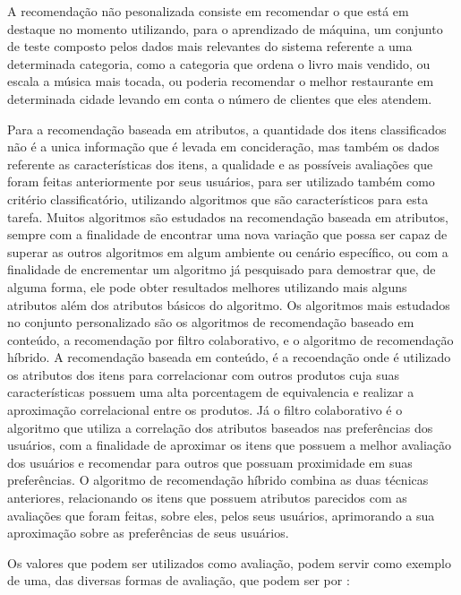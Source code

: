 \documentclass[12pt,
				openright,
				twoside,
				a4paper,
				apter=TITLE,
				section=TITLE,
				subsection=TITLE,
				chapter=TITLE,
				english,
				french,
				spanish,
				brazil]{abntex2}
\begin{document}
A recomendação não pesonalizada consiste em recomendar o que está em destaque no momento utilizando, para o aprendizado de máquina, um conjunto de teste composto pelos dados mais relevantes do sistema referente a uma determinada categoria, como a categoria que ordena o livro mais vendido, ou escala a música mais tocada, ou poderia recomendar o melhor restaurante em determinada cidade levando em conta o número de clientes que eles atendem.

Para a recomendação baseada em atributos, a quantidade dos itens classificados não é a unica informação que é levada em concideração, mas também os dados referente as características dos itens, a qualidade e as possíveis avaliações que foram feitas anteriormente por seus usuários, para ser utilizado também como critério classificatório, utilizando algoritmos que são característicos para esta tarefa. Muitos algoritmos são estudados na recomendação baseada em atributos, sempre com a finalidade de encontrar uma nova variação que possa ser capaz de superar as outros algoritmos em algum ambiente ou cenário específico, ou com a finalidade de encrementar um algoritmo já pesquisado para demostrar que, de alguma forma, ele pode obter resultados melhores utilizando mais alguns atributos além dos atributos básicos do algoritmo. Os algoritmos mais estudados no conjunto personalizado são os algoritmos de recomendação baseado em conteúdo, a recomendação por filtro colaborativo, e o algoritmo de recomendação híbrido. A recomendação baseada em conteúdo, é a recoendação onde é utilizado os atributos dos itens para correlacionar com outros produtos cuja suas características possuem uma alta porcentagem de equivalencia e realizar a aproximação correlacional entre os produtos. Já o filtro colaborativo é o algoritmo que utiliza a correlação dos atributos baseados nas preferências dos usuários, com a finalidade de aproximar os itens que possuem a melhor avaliação dos usuários e recomendar para outros que possuam proximidade em suas preferências. O algoritmo de recomendação híbrido combina as duas técnicas anteriores, relacionando os itens que possuem atributos parecidos com as avaliações que foram feitas, sobre eles, pelos seus usuários, aprimorando a sua aproximação sobre as preferências de seus usuários.

Os valores que podem ser utilizados como avaliação, podem servir como exemplo de uma, das diversas formas de avaliação, que podem ser por \cite{schafer2007collaborative}:
\end{document}
